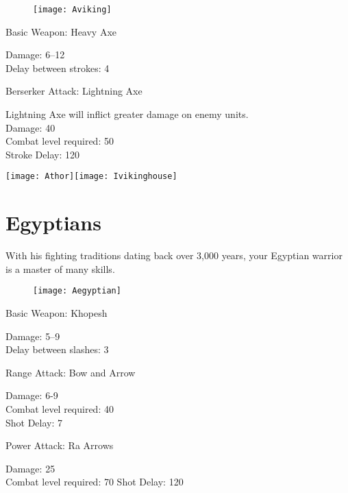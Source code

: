 \begin{wrapfigure}{r}{0.5\textwidth}
	\begin{center}
		\vspace{-20pt}
		\texttt{[image: Aviking]}
	\end{center}
	\vspace{-20pt}
\end{wrapfigure}

Basic Weapon: Heavy Axe
\begin{adjustwidth}{1cm}{}
	Damage: 6–12 \\
	Delay between strokes: 4
\end{adjustwidth}
Berserker Attack: Lightning Axe
\begin{adjustwidth}{1cm}{}
	Lightning Axe will inflict greater damage on enemy units. \\
	Damage: 40 \\
	Combat level required: 50 \\
	Stroke Delay: 120 
\end{adjustwidth}

\begin{center}
	\texttt{[image: Athor]}\texttt{[image: Ivikinghouse]}
\end{center}

\clearpage

\section{Egyptians}


With his fighting traditions dating back over 3,000 years, your Egyptian warrior is a master of many skills.

\begin{wrapfigure}{r}{0.5\textwidth}
	\begin{center}
		\vspace{-20pt}
		\texttt{[image: Aegyptian]}
	\end{center}
	\vspace{-20pt}
\end{wrapfigure}

Basic Weapon: Khopesh
\begin{adjustwidth}{1cm}{}
	Damage: 5–9 \\
	Delay between slashes: 3
	\end{adjustwidth}
Range Attack: Bow and Arrow
\begin{adjustwidth}{1cm}{}
	Damage: 6-9 \\
	Combat level required: 40 \\
	Shot Delay: 7
\end{adjustwidth}
Power Attack: Ra Arrows
\begin{adjustwidth}{1cm}{}
	Damage: 25 \\
	Combat level required: 70
	Shot Delay: 120 
\end{adjustwidth}

